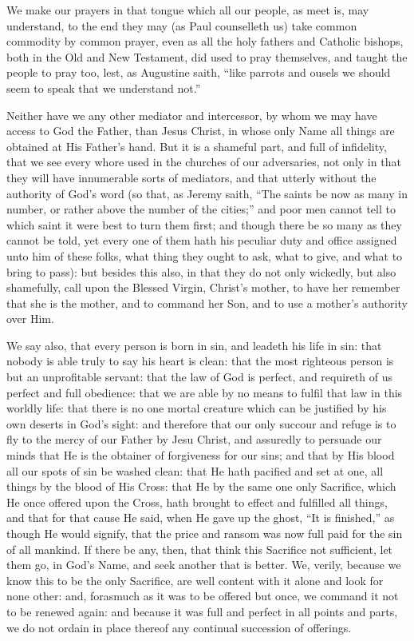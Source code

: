 We make our prayers in that tongue which all our people, as meet
is, may understand, to the end they may (as Paul counselleth us) take
common commodity by common prayer, even as all the holy fathers and
Catholic bishops, both in the Old and New Testament, did used to pray
themselves, and taught the people to pray too, lest, as Augustine saith,
“like parrots and ousels we should seem to speak that we understand
not.”

Neither have we any other mediator and intercessor, by whom we may
have access to God the Father, than Jesus Christ, in whose only Name
all things are obtained at His Father’s hand. But it is
a shameful part, and full of infidelity, that we see every whore used
in the churches of our adversaries, not only in that they will have
innumerable sorts of mediators, and that utterly without the authority
of God’s word (so that, as Jeremy saith, “The saints be
now as many in number, or rather above the number of the cities;”
and poor men cannot tell to which saint it were best to turn them first;
and though there be so many as they cannot be told, yet every one of
them hath his peculiar duty and office assigned unto him of these folks,
what thing they ought to ask, what to give, and what to bring to pass):
but besides this also, in that they do not only wickedly, but also shamefully,
call upon the Blessed Virgin, Christ’s mother, to have her remember
that she is the mother, and to command her Son, and to use a mother’s
authority over Him.

We say also, that every person is born in sin, and leadeth his life
in sin: that nobody is able truly to say his heart is clean: that the
most righteous person
is but an unprofitable servant: that the law of God is perfect, and
requireth of us perfect and full obedience: that we are able by no means
to fulfil that law in this worldly life: that there is no one mortal
creature which can be justified by his own deserts in God’s sight:
and therefore that our only succour and refuge is to fly to the mercy
of our Father by Jesu Christ, and assuredly to persuade our minds that
He is the obtainer of forgiveness for our sins; and that by His blood
all our spots of sin be washed clean: that He hath pacified and set
at one, all things by the blood of His Cross: that He by the same one
only Sacrifice, which He once offered upon the Cross, hath brought to
effect and fulfilled all things, and that for that cause He said, when
He gave up the ghost, “It is finished,” as though He would
signify, that the price and ransom was now full paid for the sin of
all mankind. If there be any, then, that think this Sacrifice
not sufficient, let them go, in God’s Name, and seek another that
is better. We, verily, because we know this to be the only Sacrifice,
are well content with it alone and look for none other: and, forasmuch
as it was to be offered but once, we command it not to be renewed again:
and because it was full and perfect in all points and parts, we do
not ordain in place thereof any continual succession of offerings.

